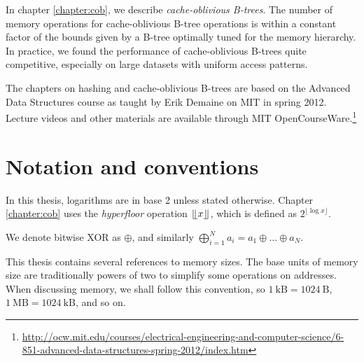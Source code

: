 In chapter \ref{chapter:cob}, we describe \emph{cache-oblivious B-trees}.
The number of memory operations for cache-oblivious B-tree operations
is within a constant factor of the bounds given by a B-tree optimally tuned
for the memory hierarchy. In practice, we found the performance of
cache-oblivious B-trees quite competitive, especially on large datasets
with uniform access patterns.

The chapters on hashing and cache-oblivious B-trees are based on the Advanced
Data Structures course as taught by Erik Demaine on MIT in spring 2012.
Lecture videos and other materials are available through MIT OpenCourseWare.\footnote{%
\url{http://ocw.mit.edu/courses/electrical-engineering-and-computer-science/6-851-advanced-data-structures-spring-2012/index.htm}}

\section*{Notation and conventions}
In this thesis, logarithms are in base 2 unless stated otherwise.
Chapter \ref{chapter:cob} uses the \emph{hyperfloor} operation
$\lfloor \kern -0.22em \lfloor x\rfloor \kern -0.22em \rfloor$, which is defined as $2^{\lfloor\log x\rfloor}$.

We denote bitwise XOR as $\oplus$, and similarly $\bigoplus_{i=1}^N
a_i=a_1\oplus\ldots\oplus a_N$.

This thesis contains several references to memory sizes. The base units of
memory size are traditionally powers of two to simplify some operations on
addresses.
When discussing memory, we shall follow this convention, so
$1\ \mathrm{kB}=1024\ \mathrm{B}$, $1\ \mathrm{MB}=1024\ \mathrm{kB}$,
and so on.
